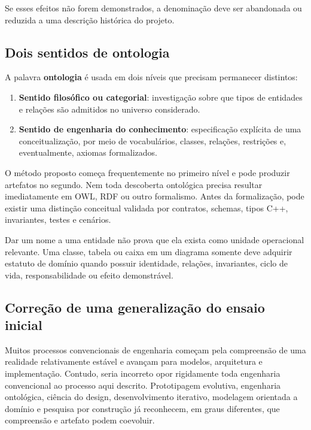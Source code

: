 \documentclass[11pt,a4paper,oneside]{article}
\newcommand{\termo}[1]{\textbf{#1}}
\begin{document}
Se esses efeitos não forem demonstrados, a denominação deve ser abandonada ou reduzida a uma descrição histórica do projeto.

\subsection{Dois sentidos de ontologia}

A palavra \termo{ontologia} é usada em dois níveis que precisam permanecer distintos:

\begin{enumerate}
  \item \textbf{Sentido filosófico ou categorial}: investigação sobre que tipos de entidades e relações são admitidos no universo considerado.
  \item \textbf{Sentido de engenharia do conhecimento}: especificação explícita de uma conceitualização, por meio de vocabulários, classes, relações, restrições e, eventualmente, axiomas formalizados.
\end{enumerate}

O método proposto começa frequentemente no primeiro nível e pode produzir artefatos no segundo. Nem toda descoberta ontológica precisa resultar imediatamente em OWL, RDF ou outro formalismo. Antes da formalização, pode existir uma distinção conceitual validada por contratos, schemas, tipos C++, invariantes, testes e cenários.

\begin{alerta}
Dar um nome a uma entidade não prova que ela exista como unidade operacional relevante. Uma classe, tabela ou caixa em um diagrama somente deve adquirir estatuto de domínio quando possuir identidade, relações, invariantes, ciclo de vida, responsabilidade ou efeito demonstrável.
\end{alerta}

\subsection{Correção de uma generalização do ensaio inicial}

Muitos processos convencionais de engenharia começam pela compreensão de uma realidade relativamente estável e avançam para modelos, arquitetura e implementação. Contudo, seria incorreto opor rigidamente toda engenharia convencional ao processo aqui descrito. Prototipagem evolutiva, engenharia ontológica, ciência do design, desenvolvimento iterativo, modelagem orientada a domínio e pesquisa por construção já reconhecem, em graus diferentes, que compreensão e artefato podem coevoluir.
\end{document}
